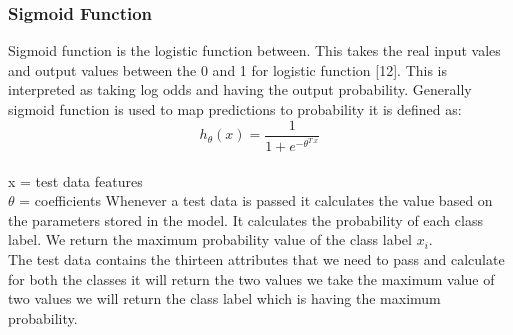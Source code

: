 \documentclass{book}
\begin{document}
    		
    
    	\subsubsection{Sigmoid Function}
    		Sigmoid function is the logistic function between. This takes the 
    		real input vales and output values between the 0 and 1 for logistic 
    		function [12]. This is interpreted as taking log odds and having 
    		the output probability. Generally sigmoid function is used to map 
    		predictions to probability it is defined as:
    		\[ h_\theta(x) = \frac{1}{1 + e^{-\theta^{T.x}}} \]\\
    		x = test data features \\
    		$\theta$ = coefficients 
    		Whenever a  test  data is passed it calculates  the  value based on 
    		the parameters stored in the model. It calculates the probability 
    		of each class label. We return the maximum probability value of 
    		the class label $x_i$.\\
    		The test data contains the thirteen attributes that we need to pass 
    		and calculate   for both  the classes it will return  the two values 
    		we take the maximum value of two values we will return the class 
    		label which is having the maximum probability.
    	
    	
    	
    		
\end{document}
